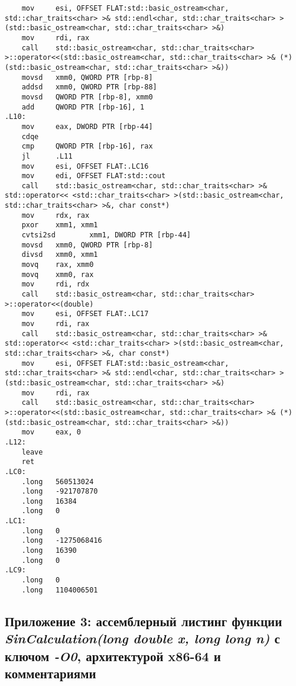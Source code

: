\documentclass[12pt,a4paper]{article}
\numberwithin{subsection}{section}
\begin{document}
\begin{lstlisting}
    mov     esi, OFFSET FLAT:std::basic_ostream<char, std::char_traits<char> >& std::endl<char, std::char_traits<char> >(std::basic_ostream<char, std::char_traits<char> >&)
    mov     rdi, rax
    call    std::basic_ostream<char, std::char_traits<char> >::operator<<(std::basic_ostream<char, std::char_traits<char> >& (*)(std::basic_ostream<char, std::char_traits<char> >&))
    movsd   xmm0, QWORD PTR [rbp-8]
    addsd   xmm0, QWORD PTR [rbp-88]
    movsd   QWORD PTR [rbp-8], xmm0
    add     QWORD PTR [rbp-16], 1
.L10:
    mov     eax, DWORD PTR [rbp-44]
    cdqe
    cmp     QWORD PTR [rbp-16], rax
    jl      .L11
    mov     esi, OFFSET FLAT:.LC16
    mov     edi, OFFSET FLAT:std::cout
    call    std::basic_ostream<char, std::char_traits<char> >& std::operator<< <std::char_traits<char> >(std::basic_ostream<char, std::char_traits<char> >&, char const*)
    mov     rdx, rax
    pxor    xmm1, xmm1
    cvtsi2sd        xmm1, DWORD PTR [rbp-44]
    movsd   xmm0, QWORD PTR [rbp-8]
    divsd   xmm0, xmm1
    movq    rax, xmm0
    movq    xmm0, rax
    mov     rdi, rdx
    call    std::basic_ostream<char, std::char_traits<char> >::operator<<(double)
    mov     esi, OFFSET FLAT:.LC17
    mov     rdi, rax
    call    std::basic_ostream<char, std::char_traits<char> >& std::operator<< <std::char_traits<char> >(std::basic_ostream<char, std::char_traits<char> >&, char const*)
    mov     esi, OFFSET FLAT:std::basic_ostream<char, std::char_traits<char> >& std::endl<char, std::char_traits<char> >(std::basic_ostream<char, std::char_traits<char> >&)
    mov     rdi, rax
    call    std::basic_ostream<char, std::char_traits<char> >::operator<<(std::basic_ostream<char, std::char_traits<char> >& (*)(std::basic_ostream<char, std::char_traits<char> >&))
    mov     eax, 0
.L12:
    leave
    ret
.LC0:
    .long   560513024
    .long   -921707870
    .long   16384
    .long   0
.LC1:
    .long   0
    .long   -1275068416
    .long   16390
    .long   0
.LC9:
    .long   0
    .long   1104006501
\end{lstlisting}


\subsection*{Приложение 3: ассемблерный листинг функции \\
\textbf{\textit{SinCalculation(long double x, long long n)}} с 
ключом \textit{-O0}, архитектурой x86-64 и комментариями}\label{app:app3}
\end{document}
